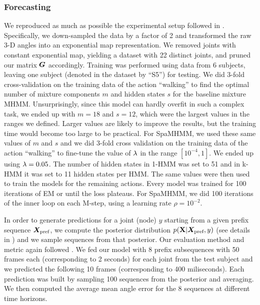 \subsubsection{Forecasting}

We reproduced as much as possible the experimental setup followed in \citet{Fragkiadaki2015}. Specifically, we down-sampled the data by a factor of 2 and transformed the raw 3-D angles into an exponential map representation. We removed joints with constant exponential map, yielding a dataset with 22 distinct joints, and pruned our matrix ${\bm{G}}$ accordingly. Training was performed using data from 6 subjects, leaving one subject (denoted in the dataset by ``S5'') for testing. We did 3-fold cross-validation on the training data of the action ``walking'' to find the optimal number of mixture components $m$ and hidden states $s$ for the baseline mixture MHMM. Unsurprisingly, since this model can hardly overfit in such a complex task, we ended up with $m=18$ and $s=12$, which were the largest values in the ranges we defined. Larger values are likely to improve the results, but the training time would become too large to be practical. For SpaMHMM, we used these same values of $m$ and $s$ and we did 3-fold cross validation on the training data of the action ``walking'' to fine-tune the value of $\lambda$ in the range $[10^{-4}, 1]$. We ended up using $\lambda=0.05$. The number of hidden states in 1-HMM was set to 51 and in k-HMM it was set to 11 hidden states per HMM. The same values were then used to train the models for the remaining actions. Every model was trained for 100 iterations of EM  or until the loss plateaus. For SpaMHMM, we did 100 iterations of the inner loop on each M-step, using a learning rate $\rho=10^{-2}$.

In order to generate predictions for a joint (node) $y$ starting from a given prefix sequence ${\bm{X}}_{\text{pref}}$, we compute the posterior distribution $p({\mathbf{X}} | {\bm{X}}_{\text{pref}}, y)$ (see details in ) and we sample sequences from that posterior. Our evaluation method and metric again followed \citet{Fragkiadaki2015}. We fed our model with 8 prefix subsequences with 50 frames each (corresponding to 2 seconds) for each joint from the test subject and we predicted the following 10 frames (corresponding to 400 miliseconds). Each prediction was built by sampling 100 sequences from the posterior and averaging. We then computed the average mean angle error for the 8 sequences at different time horizons. 


